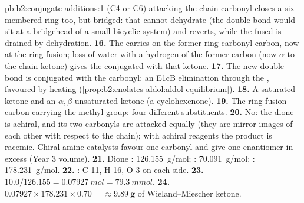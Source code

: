 \begin{solution}{pb:b2:conjugate-additions:1}
 (C4 or C6) attacking the chain carbonyl closes a six-membered ring too, but bridged: that 
cannot dehydrate (the double bond would sit at a bridgehead of a small bicyclic system) and reverts,
while the fused  is drained by dehydration.
\textbf{16.} The  carries  on the former ring carbonyl carbon, now at the ring fusion; loss
of water with a hydrogen of the former  carbon (now $\alpha$ to the chain ketone) gives the
 conjugated with that ketone.
\textbf{17.} The new double bond is conjugated with the carbonyl: an E1cB elimination through the
, favoured by heating (\cref{prop:b2:enolates-aldol:aldol-equilibrium}).
\textbf{18.} A saturated ketone and an $\alpha,\beta$-unsaturated ketone (a cyclohexenone).
\textbf{19.} The ring-fusion carbon carrying the methyl group: four different substituents.
\textbf{20.} No: the dione is achiral, and its two carbonyls are attacked equally (they are mirror images
of each other with respect to the chain); with achiral reagents the product is racemic. Chiral amine
catalysts favour one carbonyl and give one enantiomer in excess (Year 3 volume).
\textbf{21.} Dione : \qty{126.155}{g/mol}; : \qty{70.091}{g/mol}; :
\qty{178.231}{g/mol}.
\textbf{22.} : C 11, H 16, O 3 on each side.
\textbf{23.} $10.0/126.155 = \qty{0.07927}{mol} = \qty{79.3}{mmol}$.
\textbf{24.} $0.07927 \times 178.231 \times 0.70 = \boldsymbol{\approx \qty{9.89}{g}}$ of
Wieland--Miescher ketone.
\end{solution}
